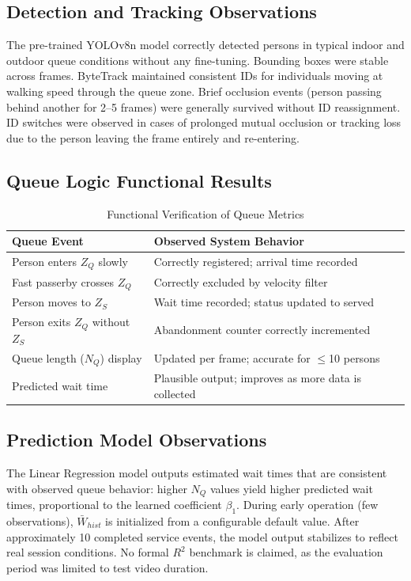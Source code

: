 \documentclass[journal, twocolumn]{IEEEtran}
\begin{document}
\subsection{Detection and Tracking Observations}
The pre-trained YOLOv8n model correctly detected persons in typical indoor and outdoor queue conditions without any fine-tuning. Bounding boxes were stable across frames. ByteTrack maintained consistent IDs for individuals moving at walking speed through the queue zone. Brief occlusion events (person passing behind another for 2--5 frames) were generally survived without ID reassignment. ID switches were observed in cases of prolonged mutual occlusion or tracking loss due to the person leaving the frame entirely and re-entering.

\subsection{Queue Logic Functional Results}
\begin{table}[htbp]
\caption{Functional Verification of Queue Metrics}
\begin{center}
\begin{tabular}{|l|p{4.2cm}|}
\hline
\textbf{Queue Event} & \textbf{Observed System Behavior} \\
\hline
Person enters $Z_Q$ slowly & Correctly registered; arrival time recorded \\
\hline
Fast passerby crosses $Z_Q$ & Correctly excluded by velocity filter \\
\hline
Person moves to $Z_S$ & Wait time recorded; status updated to served \\
\hline
Person exits $Z_Q$ without $Z_S$ & Abandonment counter correctly incremented \\
\hline
Queue length ($N_Q$) display & Updated per frame; accurate for $\leq$10 persons \\
\hline
Predicted wait time & Plausible output; improves as more data is collected \\
\hline
\end{tabular}
\label{tab:results}
\end{center}
\end{table}

\subsection{Prediction Model Observations}
The Linear Regression model outputs estimated wait times that are consistent with observed queue behavior: higher $N_Q$ values yield higher predicted wait times, proportional to the learned coefficient $\beta_1$. During early operation (few observations), $\bar{W}_{hist}$ is initialized from a configurable default value. After approximately 10 completed service events, the model output stabilizes to reflect real session conditions. No formal $R^2$ benchmark is claimed, as the evaluation period was limited to test video duration.
\end{document}
